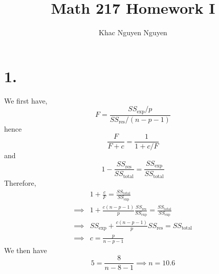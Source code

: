 \documentclass[11pt]{article}
\title{\textbf{Math 217 Homework I}}
\author{Khac Nguyen Nguyen}
\date{}
\theoremstyle{mystyle}
\theoremstyle{definition}
\begin{document}
\section*{1.}
We first have, 
\[
  F = \displaystyle\frac{SS_{\exp}/p}{SS_{\text{res}}/(n-p-1)}
\]
hence
\[
  \displaystyle\frac{F}{F+c} = \displaystyle\frac{1}{1 + c/F}
\]
and  
\[
  1 - \displaystyle\frac{SS_{\text{res}}}{SS_{\text{total}}} = \displaystyle\frac{SS_{\exp}}{SS_{\text{total}}}
\]
Therefore,
\begin{align*} 
  &1 + \displaystyle\frac{c}{F} = \frac{SS_\text{total}}{SS_{\exp}}\\
  \implies &1 + \displaystyle\frac{c(n-p-1)}{p} \displaystyle\frac{SS_\text{res}}{SS_{\exp}} = \frac{SS_\text{total}}{SS_{\exp}}\\
  \implies &SS_{\exp}+ \displaystyle\frac{c(n-p-1)}{p} SS_\text{res} = SS_\text{total} \\
  \implies &c = \displaystyle\frac{p}{n-p-1}
\end{align*}
We then have 
\[
  5 = \displaystyle\frac{8}{n-8-1} \implies n = 10.6 
\]
\pagebreak
\end{document}
